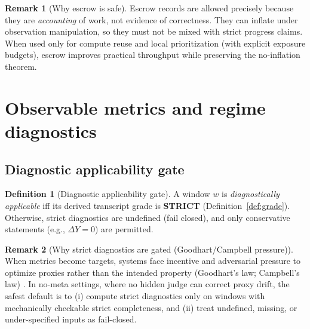 \documentclass[11pt]{article}
\newcommand{\term}[1]{\emph{#1}}
\newcommand{\1}{\mathbf{1}}
\theoremstyle{definition}
\newtheorem{definition}{Definition}
\newtheorem{remark}{Remark}
\theoremstyle{plain}
\begin{document}
\begin{remark}[Why escrow is safe]
Escrow records are allowed precisely because they are \emph{accounting} of work, not evidence of correctness.
They can inflate under observation manipulation, so they must not be mixed with strict progress claims.
When used only for compute reuse and local prioritization (with explicit exposure budgets), escrow improves practical throughput while preserving the no-inflation theorem.
\end{remark}
\section{Observable metrics and regime diagnostics}
\label{sec:metrics}

\subsection{Diagnostic applicability gate}
\begin{definition}[Diagnostic applicability gate]
\label{def:diag_gate}
A window $w$ is \term{diagnostically applicable} iff its derived transcript grade is \textbf{STRICT} (Definition~\ref{def:grade}). Otherwise, strict diagnostics are undefined (fail closed), and only conservative statements (e.g., $\Delta Y=0$) are permitted.
\end{definition}

\begin{remark}[Why strict diagnostics are gated (Goodhart/Campbell pressure)]
When metrics become targets, systems face incentive and adversarial pressure to optimize proxies rather than the intended property (Goodhart's law; Campbell's law) \cite{Goodhart1975,Campbell1979,ManheimGarrabrant2018}. In no-meta settings, where no hidden judge can correct proxy drift, the safest default is to (i) compute strict diagnostics only on windows with mechanically checkable strict completeness, and (ii) treat undefined, missing, or under-specified inputs as fail-closed.
\end{remark}
\end{document}
